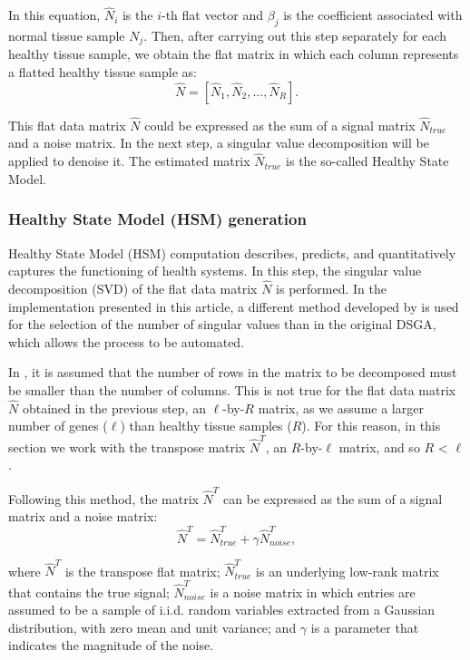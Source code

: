 In this equation, \(\hat{N}_{i}\) is the \(i\)-th flat vector and \(\beta_{j}\) is the coefficient associated with normal tissue sample \(N_{j}\). Then, after carrying out this step separately for each healthy tissue sample, we obtain the flat matrix in which each column represents a flatted healthy tissue sample as:
\[\hat{N} = \left[\hat{N}_{1},\hat{N}_{2},...,\hat{N}_{R}\right].\]

This flat data matrix \(\hat{N}\) could be expressed as the sum of a signal matrix \(\hat{N}_{true}\) and a noise matrix. In the next step, a singular value decomposition will be applied to denoise it. The estimated matrix \(\hat{N}_{true}\) is the so-called Healthy State Model.

\hypertarget{section2.1.2}{%
\subsubsection{Healthy State Model (HSM) generation}\label{section2.1.2}}

Healthy State Model (HSM) computation describes, predicts, and quantitatively captures the functioning of health systems. In this step, the singular value decomposition (SVD) of the flat data matrix \(\hat{N}\) is performed. In the implementation presented in this article, a different method developed by \citet{gavish2014optimal} is used for the selection of the number of singular values than in the original DSGA, which allows the process to be automated.

In \citet{gavish2014optimal}, it is assumed that the number of rows in the matrix to be decomposed must be smaller than the number of columns. This is not true for the flat data matrix \(\hat{N}\) obtained in the previous step, an \(\ell\)-by-\(R\) matrix, as we assume a larger number of genes (\(\ell\)) than healthy tissue samples (\(R\)). For this reason, in this section we work with the transpose matrix \(\hat{N}^T\), an \(R\)-by-\(\ell\) matrix, and so \(R\) \textless{} \(\ell\).

Following this method, the matrix \(\hat{N}^T\) can be expressed as the sum of a signal matrix and a noise matrix:
\[\hat{N}^T = \hat{N}_{true}^T + \gamma \hat{N}_{noise}^T,\]

where \(\hat{N}^T\) is the transpose flat matrix; \(\hat{N}_{true}^T\) is an underlying low-rank matrix that contains the true signal; \(\hat{N}_{noise}^T\) is a noise matrix in which entries are assumed to be a sample of i.i.d. random variables extracted from a Gaussian distribution, with zero mean and unit variance; and \(\gamma\) is a parameter that indicates the magnitude of the noise.

